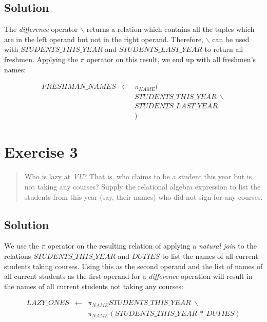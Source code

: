 \documentclass[11pt]{article}
\begin{document}
\subsection*{Solution}

The \emph{difference} operator $\backslash$ returns a relation which contains all the tuples which are in the left operand but not in the right operand. Therefore, $\backslash$ can be used with $STUDENTS\_THIS\_YEAR$ and $STUDENTS\_LAST\_YEAR$ to return all freshmen. Applying the $\pi$ operator on this result, we end up with all freshmen's names:

\begin{eqnarray*}
FRESHMAN\_NAMES & \gets & \pi_{NAME} ( \\
& & STUDENTS\_THIS\_YEAR \ \backslash \\
& & STUDENTS\_LAST\_YEAR \\
& & )
\end{eqnarray*}


\newpage

\section{Exercise 3}

\begin{quote}
Who is lazy at \emph{VU}? That is, who claims to be a student this year but is not taking any courses? Supply the relational algebra expression to list the students from this year (say, their names) who did not sign for any courses.
\end{quote}

\subsection*{Solution}

We use the $\pi$ operator on the resulting relation of applying a \emph{natural join} to the relations $STUDENTS\_THIS\_YEAR$ and $DUTIES$ to list the names of all current students taking courses. Using this as the second operand and the list of names of all current students as the first operand for a \emph{difference} operation will result in the names of all current students not taking any courses:

\begin{eqnarray*}
LAZY\_ONES & \gets & \pi_{NAME}STUDENTS\_THIS\_YEAR \ \backslash \\
& & \pi_{NAME}(STUDENTS\_THIS\_YEAR \ \ast \ DUTIES)
\end{eqnarray*}
\end{document}
